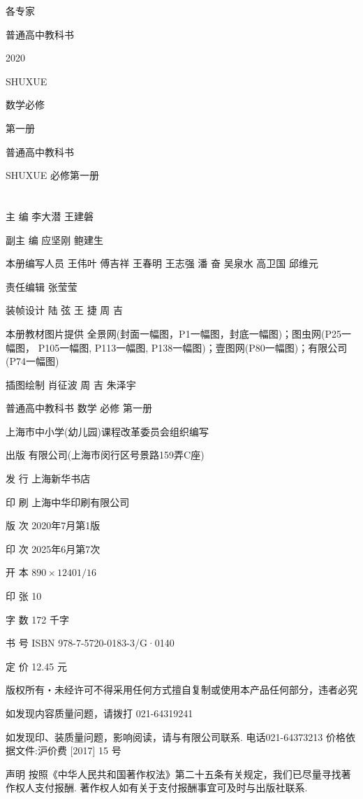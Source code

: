 \documentclass[10pt]{article}
\begin{document}
各专家

普通高中教科书

2020

SHUXUE

数学必修

第一册







普通高中教科书

SHUXUE 必修第一册

\section*{}

主 编 李大潜 王建磐

副主 编 应坚刚 鲍建生

本册编写人员 王伟叶 傅吉祥 王春明 王志强 潘 奋 吴泉水 高卫国 邱维元

责任编辑 张莹莹

装帧设计 陆 弦 王 捷 周 吉

本册教材图片提供 全景网(封面一幅图，P1一幅图，封底一幅图)；图虫网(P25一幅图， P105一幅图, P113一幅图, P138一幅图)；壹图网(P80一幅图)；有限公司 (P74一幅图)

插图绘制 肖征波 周 吉 朱泽宇

普通高中教科书 数学 必修 第一册

上海市中小学(幼儿园)课程改革委员会组织编写

出版 有限公司(上海市闵行区号景路159弄C座)

发 行 上海新华书店

印 刷 上海中华印刷有限公司

版 次 2020年7月第1版

印 次 2025年6月第7次

开 本 \({890} \times  {1240}\mathrm{1/{16}}\)

印 张 10

字 数 172 千字

书 号 ISBN 978-7-5720-0183-3/G·0140

定 价 12.45 元

版权所有・未经许可不得采用任何方式擅自复制或使用本产品任何部分，违者必究

如发现内容质量问题，请拨打 021-64319241

如发现印、装质量问题，影响阅读，请与有限公司联系. 电话021-64373213 价格依据文件:沪价费 [2017] 15 号

声明 按照《中华人民共和国著作权法》第二十五条有关规定，我们已尽量寻找著作权人支付报酬. 著作权人如有关于支付报酬事宜可及时与出版社联系.
\end{document}
